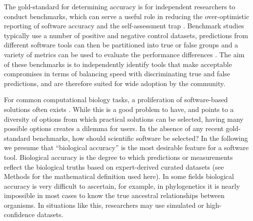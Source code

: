 \documentclass[fleqn,10pt]{SelfArx} %
\begin{document}
The gold-standard for determining accuracy is for independent
researchers to conduct benchmarks, which can serve a useful role in
reducing the over-optimistic reporting of software accuracy
\cite{Boulesteix2010-te,Jelizarow2010-zf,Weber:2019} and the self-assessment trap
\cite{Norel2011-cq,Buchka:2021}. Benchmark studies typically use a number of
positive and negative control datasets, predictions from different software tools can then be
partitioned into true or false groups and a variety of metrics can be
used to evaluate the performance differences
\cite{Egan1975-nd,Hall2012-kg,Weber:2019}.
The aim of these benchmarks is to independently identify tools that
make acceptable compromises in terms of balancing speed with
discriminating true and false predictions, and are therefore suited
for wide adoption by the community.

For common computational biology tasks, a proliferation of
software-based solutions often exists
\cite{Felsenstein1995-ic,Altschul2013-bv,Henry2014-ut,Wikipedia_contributors2015-vj,Wikipedia_contributors2015-hr}. While
this is a good problem to have, and points to a
diversity of options from which practical solutions can be selected,
having many possible options creates a dilemma for users. In the absence of
any recent gold-standard benchmarks, how should scientific software be
selected? In the following we presume that ``biological
accuracy'' is the most desirable feature for a software tool. Biological
accuracy is the degree to which predictions or measurements reflect
the biological truths based on expert-derived curated datasets (see Methods for the  mathematical definition used here). In some
fields biological accuracy is very difficult to ascertain, for
example, in phylogenetics it is nearly impossible in most cases to know the
true ancestral relationships between organisms. In situations like this,
researchers may use simulated or high-confidence datasets.
\end{document}
